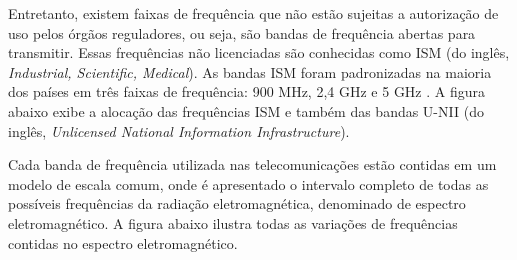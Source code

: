 Entretanto, existem faixas de frequência que não estão sujeitas a autorização de uso pelos órgãos reguladores, ou seja, são bandas de frequência abertas para transmitir. Essas frequências não licenciadas são conhecidas como ISM (do inglês, \textit{Industrial, Scientific, Medical}). As bandas ISM foram padronizadas na maioria dos países em três faixas de frequência: 900 MHz, 2,4 GHz e 5 GHz \cite{moraes2010,tanenbaum2011}. A figura abaixo exibe a alocação das frequências ISM e também das bandas U-NII (do inglês, \textit{Unlicensed National Information Infrastructure}).
\begin{figure}[H]
	\centering
\end{figure}

Cada banda de frequência utilizada nas telecomunicações estão contidas em um modelo de escala comum, onde é apresentado o intervalo completo de todas as possíveis frequências da radiação eletromagnética, denominado de espectro eletromagnético. A figura abaixo ilustra todas as variações de frequências contidas no espectro eletromagnético.
\begin{figure}[H]
	\centering
\end{figure}

